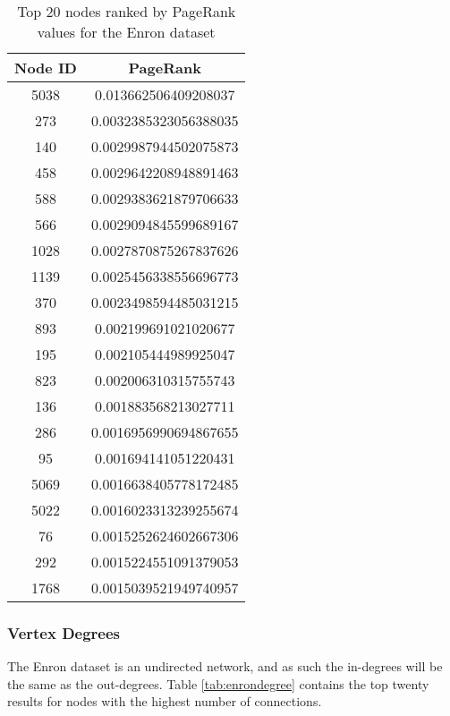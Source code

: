 \begin{table}%
\centering
\begin{tabular}{|c|c|}
\hline
Node ID & PageRank \\
\hline
5038 & 0.013662506409208037 \\
273 & 0.0032385323056388035 \\
140 & 0.0029987944502075873 \\
458 & 0.0029642208948891463 \\
588 & 0.0029383621879706633 \\
566 & 0.0029094845599689167 \\
1028 & 0.0027870875267837626 \\
1139 & 0.0025456338556696773 \\
370 & 0.0023498594485031215 \\
893 & 0.002199691021020677 \\
195 & 0.002105444989925047 \\
823 & 0.002006310315755743 \\
136 & 0.001883568213027711 \\
286 & 0.0016956990694867655 \\
95 & 0.001694141051220431 \\
5069 & 0.0016638405778172485 \\
5022 & 0.0016023313239255674 \\
76 & 0.0015252624602667306 \\
292 & 0.0015224551091379053 \\
1768 & 0.0015039521949740957 \\
\hline
\end{tabular}
\caption{Top 20 nodes ranked by PageRank values for the Enron dataset}
\label{tab:enronpagerank}
\end{table}

\subsubsection{Vertex Degrees}
The Enron dataset is an undirected network, and as such the in-degrees will be the same as the out-degrees. Table \ref{tab:enrondegree} contains the top twenty results for nodes with the highest number of connections.

